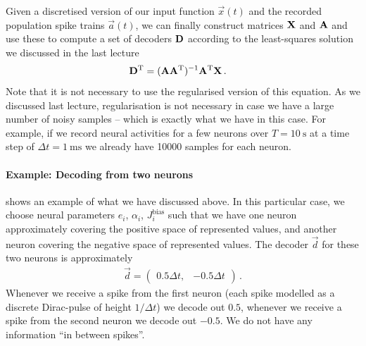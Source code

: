 \documentclass[10pt,letterpaper,oneside]{article}
\begin{document}
Given a discretised version of our input function $\vec x(t)$ and the recorded population spike trains $\vec a(t)$, we can finally construct matrices ${\mathbf{X}}$ and ${\mathbf{A}}$ and use these to compute a set of decoders ${\mathbf{D}}$ according to the least-squares solution we discussed in the last lecture
\begin{align*}
	{\mathbf{D}}^{\mathrm{T}} &= ({\mathbf{A}} {\mathbf{A}}^{\mathrm{T}})^{-1} {\mathbf{A}}^{\mathrm{T}} {\mathbf{X}} \,.
\end{align*}
Note that it is not necessary to use the regularised version of this equation. As we discussed last lecture, regularisation is not necessary in case we have a large number of noisy samples -- which is exactly what we have in this case. For example, if we record neural activities for a few neurons over $T = \SI{10}{\second}$ at a time step of $\Delta t = \SI{1}{\milli\second}$ we already have \num{10000} samples for each neuron.


\paragraph{Example: Decoding from two neurons}
 shows an example of what we have discussed above. In this particular case, we choose neural parameters $e_i$, $\alpha_i$, $J^\mathrm{bias}_i$ such that we have one neuron approximately covering the positive space of represented values, and another neuron covering the negative space of represented values. The decoder $\vec d$ for these two neurons is approximately
\begin{align*}
	\vec d = \begin{pmatrix} 0.5 \Delta t, & -0.5 \Delta t \end{pmatrix} \,.
\end{align*}
Whenever we receive a spike from the first neuron (each spike modelled as a discrete Dirac-pulse of height $1/\Delta t$) we decode out $0.5$, whenever we receive a spike from the second neuron we decode out $-0.5$. We do not have any information \enquote{in between spikes}.
\end{document}
